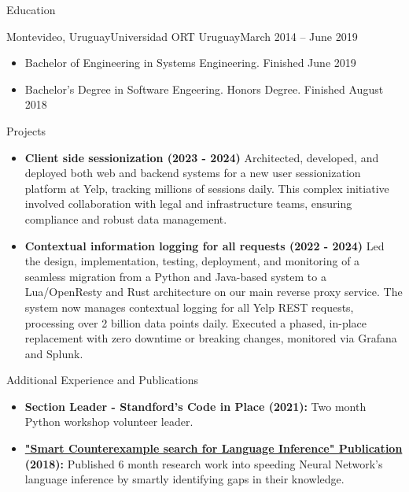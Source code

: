 \documentclass[]{mcdowellcv}
\begin{document}
	\begin{cvsection}{Education}
		\begin{cvsubsection}{Montevideo, Uruguay}{Universidad ORT Uruguay}{March 2014 -- June 2019}
			\begin{itemize}
				\item Bachelor of Engineering in Systems Engineering. Finished June 2019
				\item Bachelor's Degree in Software Engeering. Honors Degree. Finished August 2018
			\end{itemize}
		\end{cvsubsection}
	\end{cvsection}
	\begin{cvsection}{Projects}
		\begin{cvsubsection}{}{}{}
			\begin{itemize}
				\item \textbf{Client side sessionization (2023 - 2024)} Architected, developed, and deployed both web and backend systems for a new user sessionization platform at Yelp, tracking millions of sessions daily. This complex initiative involved collaboration with legal and infrastructure teams, ensuring compliance and robust data management.
				\item \textbf{Contextual information logging for all requests (2022 - 2024)} Led the design, implementation, testing, deployment, and monitoring of a seamless migration from a Python and Java-based system to a Lua/OpenResty and Rust architecture on our main reverse proxy service. The system now manages contextual logging for all Yelp REST requests, processing over 2 billion data points daily. Executed a phased, in-place replacement with zero downtime or breaking changes, monitored via Grafana and Splunk.
			\end{itemize}
		\end{cvsubsection}
	\end{cvsection}
	
	\begin{cvsection}{Additional Experience and Publications}
		\begin{cvsubsection}{}{}{}	
			\begin{itemize}
				\item \textbf{Section Leader - Standford's Code in Place (2021):} Two month Python workshop volunteer leader.
				\item \textbf{\href{https://sisbibliotecas.ort.edu.uy/file/5435}{"Smart Counterexample search for Language Inference" Publication} (2018):} Published 6 month research work into speeding Neural Network's language inference by smartly identifying gaps in their knowledge.
			\end{itemize}
		\end{cvsubsection}
	\end{cvsection}
	
\end{document}
